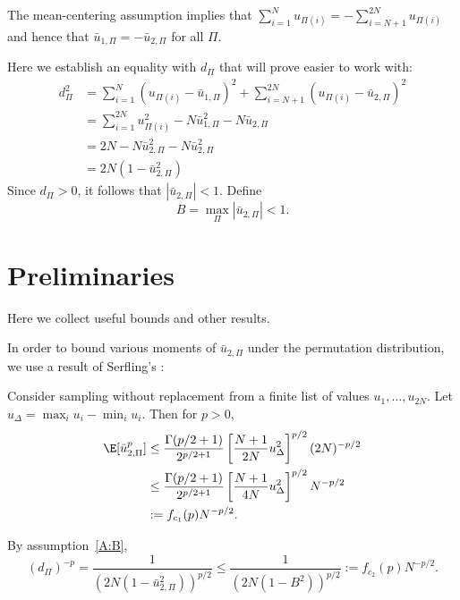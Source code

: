 The mean-centering assumption implies that $\sum_{i=1}^{N} u_{\Pi(i)} = - \sum_{i=N+1}^{2N} u_{\Pi(i)}$
and hence that $\bar{u}_{1,\Pi} = -\bar{u}_{2,\Pi}$ for all $\Pi$.  

Here we establish an equality with $d_{\Pi}$ that will prove easier to work with:
\begin{align*}
  d_\Pi^2 &=  \sum_{i=1}^N(u_{\Pi(i)} - \bar{u}_{1,\Pi})^2 + \sum_{i=N+1}^{2N}(u_{\Pi(i)} -
    \bar{u}_{2,\Pi})^2 \\
  &= \sum_{i=1}^{2N} u_{\Pi(i)}^2 - N \bar{u}_{1,\Pi}^2 - N \bar{u}_{2,\Pi} \\
  &= 2N - N \bar{u}_{2,\Pi}^2 - N \bar{u}_{2,\Pi}^2 \\
  &= 2N(1 - \bar{u}_{2,\Pi}^2)
\end{align*}
Since $d_\Pi > 0$, it follows that $|\bar{u}_{2,\Pi}| < 1$.  Define
\begin{equation}
  \label{A:B}
  B = \max_\Pi |\bar{u}_{2,\Pi}| < 1.
\end{equation}

\section{Preliminaries}
\label{S:stein-proof-preliminaries}
Here we collect useful bounds and other results.  

In order to bound various moments of $\bar{u}_{2,\Pi}$ under the permutation distribution, we use a
result of Serfling's
\cite{serfling1974probability}:
\begin{proposition}
  Consider sampling without replacement from a finite list of values
  $u_1, \ldots, u_{2N}$.  Let $u_{\Delta} = \max_i u_{i} - \min_i u_{i}$. Then for $p > 0$,
  \begin{align}
    \E [\bar{u}_{2,\Pi}^p] 
    &\leq \frac{\Gamma(p/2 + 1)}{2^{p/2 + 1}}
    \left [ \frac{N+1}{2N}u_{\Delta}^2 \right ]^{p/2}
    (2N)^{-p/2} \nonumber \\
    &\leq \frac{\Gamma(p/2 + 1)}{2^{p/2 + 1}}
    \left [ \frac{N+1}{4N}u_{\Delta}^2 \right ]^{p/2}
    N^{-p/2} \nonumber \\
    &:= f_{c_1}(p)N^{-p/2} \label{def:serfling}.
  \end{align}
\end{proposition}

By assumption~\eqref{A:B},
\begin{equation}
\label{def:dp}
  (d_{\Pi})^{-p} = \frac{1}{(2N(1-\bar{u}_{2,\Pi}^2))^{p/2}} \leq \frac{1}{(2N(1-B^2))^{p/2}} :=
  f_{c_2}(p) N^{-p/2}.
\end{equation}


